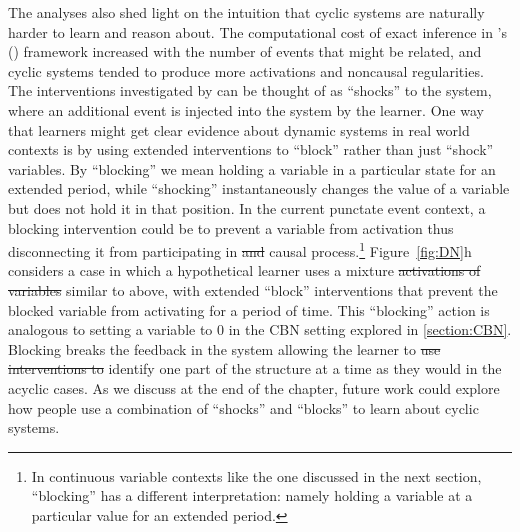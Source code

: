 \documentclass{cambridge7A}%
\def\citeapos#1{\citeauthor{#1}'s (\citeyear{#1})}
\providecommand{\DIFadd}[1]{{\protect\color{blue}\uwave{#1}}} %
\providecommand{\DIFdel}[1]{{\protect\color{red}\sout{#1}}}                      %
\providecommand{\DIFaddbegin}{} %
\providecommand{\DIFaddend}{} %
\providecommand{\DIFdelbegin}{} %
\providecommand{\DIFdelend}{} %
\newcommand{\DIFscaledelfig}{0.5}
\newlength{\DIFdelgraphicswidth} %
\newlength{\DIFdelgraphicsheight} %
\newcommand{\DIFaddincludegraphics}[2][]{{\color{blue}\fbox{\DIFOincludegraphics[#1]{#2}}}} %
\newcommand{\DIFdelincludegraphics}[2][]{%
\sbox{\DIFdelgraphicsbox}{\DIFOincludegraphics[#1]{#2}}%
\settoboxwidth{\DIFdelgraphicswidth}{\DIFdelgraphicsbox} %
\settoboxtotalheight{\DIFdelgraphicsheight}{\DIFdelgraphicsbox} %
\scalebox{\DIFscaledelfig}{%
\parbox[b]{\DIFdelgraphicswidth}{\usebox{\DIFdelgraphicsbox}\\[-\baselineskip] \rule{\DIFdelgraphicswidth}{0em}}\llap{\resizebox{\DIFdelgraphicswidth}{\DIFdelgraphicsheight}{%
\setlength{\unitlength}{\DIFdelgraphicswidth}%
\begin{picture}(1,1)%
\thicklines\linethickness{2pt} %
{\color[rgb]{1,0,0}\put(0,0){\framebox(1,1){}}}%
{\color[rgb]{1,0,0}\put(0,0){\line( 1,1){1}}}%
{\color[rgb]{1,0,0}\put(0,1){\line(1,-1){1}}}%
\end{picture}%
}\hspace*{3pt}}} %
} %
\DeclareRobustCommand{\DIFaddbegin}{\DIFOaddbegin \let\includegraphics\DIFaddincludegraphics} %
\DeclareRobustCommand{\DIFaddend}{\DIFOaddend \let\includegraphics\DIFOincludegraphics} %
\DeclareRobustCommand{\DIFdelbegin}{\DIFOdelbegin \let\includegraphics\DIFdelincludegraphics} %
\DeclareRobustCommand{\DIFdelend}{\DIFOaddend \let\includegraphics\DIFOincludegraphics} %
\begin{document}
The analyses also shed light on the intuition that cyclic systems are naturally harder to learn and reason about. The computational cost of exact inference in \citeapos{bramley2018time} framework increased with the number of events that might be related, and cyclic systems tended to produce more activations and noncausal regularities.  The interventions investigated by \cite{bramley2017dynamic} can be thought of as ``shocks'' to the system, where an additional event is injected into the system by the learner.  One way that learners might get clear evidence about dynamic systems in real world contexts is by using extended interventions to ``block'' rather than just ``shock'' variables. By ``blocking'' we mean holding a variable in a particular state for an extended period, while ``shocking'' instantaneously changes the value of a variable but does not hold it in that position.  In the current punctate event context, a blocking intervention could be to prevent a variable from activation thus disconnecting it from participating in \DIFdelbegin \DIFdel{and }\DIFdelend \DIFaddbegin \DIFadd{the }\DIFaddend causal process.\footnote{In continuous variable contexts like the one discussed in the next section, ``blocking'' has a different interpretation: namely holding a variable at a particular value for an extended period.}  Figure~\ref{fig:DN}h considers a case in which a hypothetical learner uses a mixture \DIFdelbegin \DIFdel{activations of variables }\DIFdelend \DIFaddbegin \DIFadd{of intervetions }\DIFaddend similar to above, with extended ``block'' interventions that prevent the blocked variable from activating for a period of time.  This ``blocking'' action is analogous to setting a variable to 0 in the CBN setting explored in \ref{section:CBN}. Blocking breaks the feedback in the system allowing the learner to \DIFdelbegin \DIFdel{use interventions to }\DIFdelend identify one part of the structure at a time as they would in the acyclic cases.  As we discuss at the end of the chapter, future work could explore how people use a combination of ``shocks'' and ``blocks'' to learn about cyclic systems.
\end{document}

